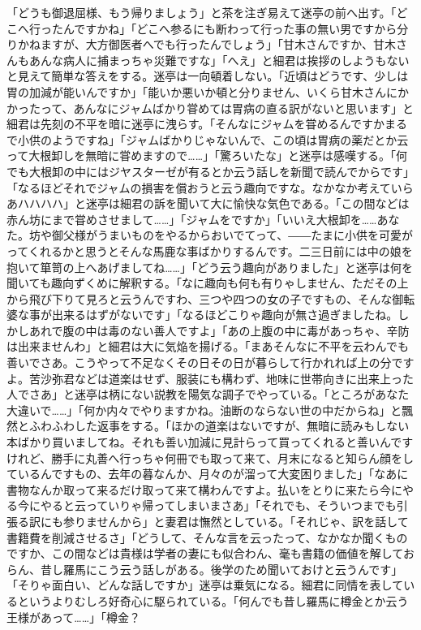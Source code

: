 \documentclass[12pt, openright]{book}
\begin{document}
「どうも御退屈様、もう帰りましょう」と茶を注ぎ易えて迷亭の前へ出す。「どこへ行ったんですかね」「どこへ参るにも断わって行った事の無い男ですから分りかねますが、大方御医者へでも行ったんでしょう」「甘木さんですか、甘木さんもあんな病人に捕まっちゃ災難ですな」「へえ」と細君は挨拶のしようもないと見えて簡単な答えをする。迷亭は一向頓着しない。「近頃はどうです、少しは胃の加減が能いんですか」「能いか悪いか頓と分りません、いくら甘木さんにかかったって、あんなにジャムばかり甞めては胃病の直る訳がないと思います」と細君は先刻の不平を暗に迷亭に洩らす。「そんなにジャムを甞めるんですかまるで小供のようですね」「ジャムばかりじゃないんで、この頃は胃病の薬だとか云って大根卸しを無暗に甞めますので\ldots{}\ldots{}」「驚ろいたな」と迷亭は感嘆する。「何でも大根卸の中にはジヤスターゼが有るとか云う話しを新聞で読んでからです」「なるほどそれでジャムの損害を償おうと云う趣向ですな。なかなか考えていらあハハハハ」と迷亭は細君の訴を聞いて大に愉快な気色である。「この間などは赤ん坊にまで甞めさせまして\ldots{}\ldots{}」「ジャムをですか」「いいえ大根卸を\ldots{}\ldots{}あなた。坊や御父様がうまいものをやるからおいでてって、――たまに小供を可愛がってくれるかと思うとそんな馬鹿な事ばかりするんです。二三日前には中の娘を抱いて箪笥の上へあげましてね\ldots{}\ldots{}」「どう云う趣向がありました」と迷亭は何を聞いても趣向ずくめに解釈する。「なに趣向も何も有りゃしません、ただその上から飛び下りて見ろと云うんですわ、三つや四つの女の子ですもの、そんな御転婆な事が出来るはずがないです」「なるほどこりゃ趣向が無さ過ぎましたね。しかしあれで腹の中は毒のない善人ですよ」「あの上腹の中に毒があっちゃ、辛防は出来ませんわ」と細君は大に気焔を揚げる。「まあそんなに不平を云わんでも善いでさあ。こうやって不足なくその日その日が暮らして行かれれば上の分ですよ。苦沙弥君などは道楽はせず、服装にも構わず、地味に世帯向きに出来上った人でさあ」と迷亭は柄にない説教を陽気な調子でやっている。「ところがあなた大違いで\ldots{}\ldots{}」「何か内々でやりますかね。油断のならない世の中だからね」と飄然とふわふわした返事をする。「ほかの道楽はないですが、無暗に読みもしない本ばかり買いましてね。それも善い加減に見計らって買ってくれると善いんですけれど、勝手に丸善へ行っちゃ何冊でも取って来て、月末になると知らん顔をしているんですもの、去年の暮なんか、月々のが溜って大変困りました」「なあに書物なんか取って来るだけ取って来て構わんですよ。払いをとりに来たら今にやる今にやると云っていりゃ帰ってしまいまさあ」「それでも、そういつまでも引張る訳にも参りませんから」と妻君は憮然としている。「それじゃ、訳を話して書籍費を削減させるさ」「どうして、そんな言を云ったって、なかなか聞くものですか、この間などは貴様は学者の妻にも似合わん、毫も書籍の価値を解しておらん、昔し羅馬にこう云う話しがある。後学のため聞いておけと云うんです」「そりゃ面白い、どんな話しですか」迷亭は乗気になる。細君に同情を表しているというよりむしろ好奇心に駆られている。「何んでも昔し羅馬に樽金とか云う王様があって\ldots{}\ldots{}」「樽金？ 
\end{document}
